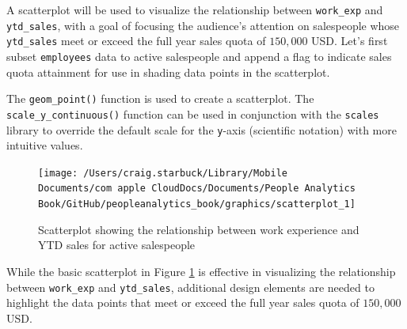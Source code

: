 \documentclass[
]{book}
\newenvironment{Shaded}{\begin{snugshade}}{\end{snugshade}}
\newcommand{\CommentTok}[1]{\textcolor[rgb]{0.56,0.35,0.01}{\textit{#1}}}
\newcommand{\DecValTok}[1]{\textcolor[rgb]{0.00,0.00,0.81}{#1}}
\newcommand{\FunctionTok}[1]{\textcolor[rgb]{0.00,0.00,0.00}{#1}}
\newcommand{\NormalTok}[1]{#1}
\newcommand{\OtherTok}[1]{\textcolor[rgb]{0.56,0.35,0.01}{#1}}
\newcommand{\SpecialCharTok}[1]{\textcolor[rgb]{0.00,0.00,0.00}{#1}}
\newcommand{\StringTok}[1]{\textcolor[rgb]{0.31,0.60,0.02}{#1}}
\begin{document}
A scatterplot will be used to visualize the relationship between \texttt{work\_exp} and \texttt{ytd\_sales}, with a goal of focusing the audience's attention on salespeople whose \texttt{ytd\_sales} meet or exceed the full year sales quota of \(150,000\) USD. Let's first subset \texttt{employees} data to active salespeople and append a flag to indicate sales quota attainment for use in shading data points in the scatterplot.

\begin{Shaded}
\end{Shaded}

The \texttt{geom\_point()} function is used to create a scatterplot. The \texttt{scale\_y\_continuous()} function can be used in conjunction with the \texttt{scales} library to override the default scale for the \texttt{y}-axis (scientific notation) with more intuitive values.

\begin{figure}

{\centering \texttt{[image: /Users/craig.starbuck/Library/Mobile Documents/com~apple~CloudDocs/Documents/People Analytics Book/GitHub/peopleanalytics\_book/graphics/scatterplot\_1]} 

}

\caption{Scatterplot showing the relationship between work experience and YTD sales for active salespeople}\label{fig:scatterplot-1}
\end{figure}

While the basic scatterplot in Figure \ref{fig:scatterplot-1} is effective in visualizing the relationship between \texttt{work\_exp} and \texttt{ytd\_sales}, additional design elements are needed to highlight the data points that meet or exceed the full year sales quota of \(150,000\) USD.
\end{document}
